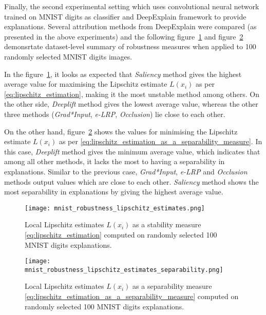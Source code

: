 \documentclass[english]{tktltiki2}
\theoremstyle{definition}
\theoremstyle{remark}
\begin{document}
Finally, the second experimental setting which uses convolutional neural network trained on MNIST digits as classifier and DeepExplain framework to provide explanations. Several attribution methods from DeepExplain were compared (as presented in the above experiments) and the following figure~\ref{fig:mnist_robustness_lipschitz_estimates} and figure~\ref{fig:mnist_robustness_lipschitz_estimates_separability} demonsrtate dataset-level summary of robustness measures when applied to 100 randomly selected MNIST digits images.

In the figure~\ref{fig:mnist_robustness_lipschitz_estimates}, it looks as expected that \textit{Saliency} method gives the highest average value for maximising the Lipschitz estimate $L(x_i)$ as per \eqref{eq:lipschitz_estimation}, making it the most unstable method among others.  On the other side, \textit{Deeplift} method gives the lowest average value, whereas the other three methods (\textit{Grad*Input}, \textit{e-LRP}, \textit{Occlusion}) lie close to each other.

On the other hand, figure~\ref{fig:mnist_robustness_lipschitz_estimates_separability} shows the values for minimising the Lipschitz estimate $L(x_i)$ as per \eqref{eq:lipschitz_estimation_as_a_separability_measure}. In this case, \textit{Deeplift} method gives the minimum average value, which indicates that among all other methods, it lacks the most to having a separability in explanations. Similar to the previous case, \textit{Grad*Input}, \textit{e-LRP} and \textit{Occlusion} methods output values which are close to each other. \textit{Saliency} method shows the most separability in explanations by giving the highest average value.

\begin{figure}[H]
	\texttt{[image: mnist\_robustness\_lipschitz\_estimates.png]}
	\vspace*{-5mm}
	\caption{Local Lipschitz estimates $L(x_i)$ as a stability measure \eqref{eq:lipschitz_estimation} computed on randomly selected 100 MNIST digits explanations.}
	\label{fig:mnist_robustness_lipschitz_estimates}
\end{figure}


\begin{figure}[H]
	\texttt{[image: mnist\_robustness\_lipschitz\_estimates\_separability.png]}
	\vspace*{-5mm}
	\caption{Local Lipschitz estimates $L(x_i)$ as a separability measure \eqref{eq:lipschitz_estimation_as_a_separability_measure} computed on randomly selected 100 MNIST digits explanations.}
	\label{fig:mnist_robustness_lipschitz_estimates_separability}
\end{figure} 
\end{document}
